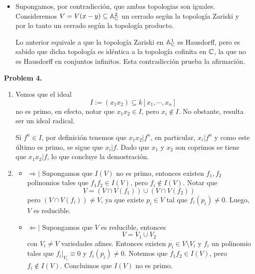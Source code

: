 \documentclass{article}
\begin{document}
\begin{itemize}
    \item[(b)] Supongamos, por contradicción, que ambas topologias son iguales. Consideremos
    $V=V(x-y)\subseteq\mathbb{A}^{2}_{\mathbb{C}}$ un cerrado según la topología Zariski y por lo tanto un cerrado 
    según la topología producto.

    \vspace{1mm}
    Lo anterior equivale a que la topología Zariski en $\mathbb{A}^{1}_{\mathbb{C}}$ es Hausdorff, pero es sabido 
    que dicha topología es idéntica a la topología cofinita en $\mathbb{C}$, la que no es Hausdorff en 
    conjuntos infinitos. Esta contradicción prueba la afirmación.
\end{itemize}

\vspace{5mm}
\noindent\textbf{Problem 4.}
\begin{enumerate}
    \item[(a)] Vemos que el ideal
    \begin{equation*}
        I:=(x_{1}x_{2})\subseteq k[x_{1},\cdots,x_{n}]
    \end{equation*}
    no es primo, en efecto, notar que $x_{1}x_{2}\in I$, pero $x_{i}\not\in I$. No obstante,
    resulta ser un ideal radical.

    \vspace{1mm}
    Si $f^{n}\in I$, por definición tenemos que $x_{1}x_{2}|f^{n}$, en particular, $x_{i}|f^{n}$ y 
    como este último es primo, se sigue que $x_{i}|f$. Dado que $x_{1}$ y $x_{2}$ son coprimos 
    se tiene que $x_{1}x_{2}|f$, lo que concluye la demostración.

    \item[(b)]
    \begin{itemize}
        \item $\Rightarrow|$ Supongamos que $I(V)$ no es primo, entonces existen $f_{1},f_{2}$ 
        polinomios tales que $f_{1}f_{2}\in I(V)$, pero $f_{i}\not\in I(V)$. Notar que
        \begin{equation*}
            V=(V\cap V(f_{1}))\cup(V\cap V(f_{2}))
        \end{equation*}
        pero $(V\cap V(f_{i}))\neq V$, ya que existe $p_{i}\in V$ tal que $f_{i}(p_{i})\neq0$. 
        Luego, $V$ es reducible.

        \item $\Leftarrow|$ Supongamos que $V$ es reducible, entonces
        \begin{equation*}
            V=V_{1}\cup V_{2}
        \end{equation*}
        con $V_{i}\neq V$ variedades afines. Entonces existen $p_{i}\in V\setminus V_{i}$ y 
        $f_{i}$ un polinomio tales que $f_{i}|_{V_{i}}\equiv0$ y $f_{i}(p_{i})\neq0$. Notemos que 
        $f_{1}f_{2}\in I(V)$, pero $f_{i}\not\in I(V)$. Concluimos que $I(V)$ no es primo.
    \end{itemize}
\end{enumerate}
\end{document}

